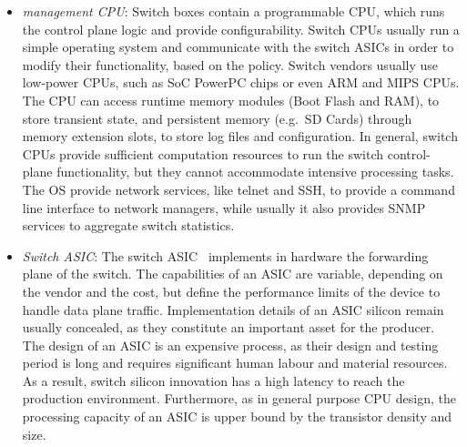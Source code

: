 \begin{itemize}
  \item \emph{management CPU}: Switch boxes contain a programmable CPU, which
        runs the control plane logic and provide configurability. Switch CPUs
        usually run a simple operating system and communicate with the switch
        ASICs in order to modify their functionality, based on the policy.
        Switch vendors usually use low-power CPUs, such as SoC PowerPC chips or
        even ARM and MIPS CPUs. The CPU can access runtime memory modules (Boot
        Flash and RAM), to store transient state, and persistent memory (e.g.~SD
        Cards) through memory extension slots, to store log files and
        configuration. In general, switch CPUs provide sufficient computation
        resources to run the switch control-plane functionality, but they cannot
        accommodate intensive processing tasks. The OS provide network services,
        like telnet and SSH, to provide a command line interface to network
        managers, while usually it also provides SNMP services to aggregate
        switch statistics. 
 
  \item \emph{Switch ASIC}: The switch ASIC~\cite{hp-asic,broadcom-asic,intel-asic}
        implements in hardware the forwarding plane of the switch.  The
        capabilities of an ASIC are variable, depending on the vendor and the
        cost, but define the performance limits of the device to handle data
        plane traffic.
        Implementation details of an ASIC silicon remain usually concealed, as
        they constitute an important asset for the producer.  The design of
        an ASIC is an expensive process, as their design and testing period is
        long and requires significant human labour and material
        resources. As a result, switch silicon innovation has a high latency to
        reach the production environment. Furthermore, as in general purpose CPU 
        design,  the processing capacity of an ASIC is upper bound by the
        transistor density and size.


\end{itemize}
